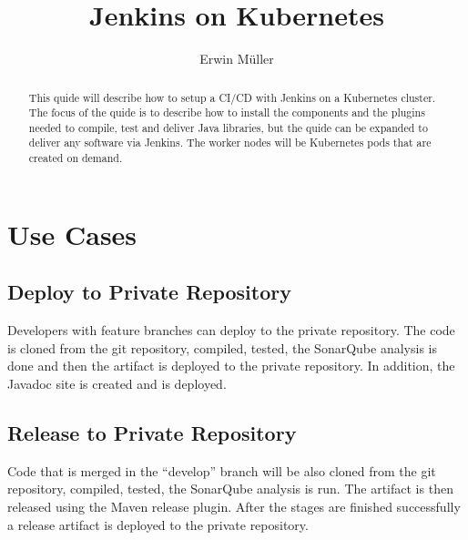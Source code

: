 \documentclass[10pt,abstract=yes,toc=flat]{docusimple}
\title{Jenk­ins on Ku­bernetes}
\author{Erwin Müller}
\begin{document}
\maketitle

\begin{abstract}

This quide will describe how to setup a CI/CD with Jenkins on a Kubernetes
cluster. The focus of the quide is to describe how to install the components 
and the plugins needed to compile, test and deliver Java libraries, but
the quide can be expanded to deliver any software via Jenkins. The worker
nodes will be Kubernetes pods that are created on demand.

\end{abstract}

\section{Use Cases}

% 
% 
% 
% 
% 
% 
% 
% 

\begin{figure}[ht]
\centering
\def\svgwidth{0.7\columnwidth}

\end{figure}

\subsection{Deploy to Private Repository}

Developers with feature branches can deploy to the private repository.
The code is cloned from the git repository, compiled, tested, the SonarQube
analysis is done and then the artifact is deployed to the private repository.
In addition, the Javadoc site is created and is deployed.

\subsection{Release to Private Repository}

Code that is merged in the ``develop'' branch will be also cloned from the 
git repository, compiled, tested, the SonarQube analysis is run. The artifact
is then released using the Maven release plugin. After the stages are finished
successfully a release artifact is deployed to the private repository.
\end{document}
